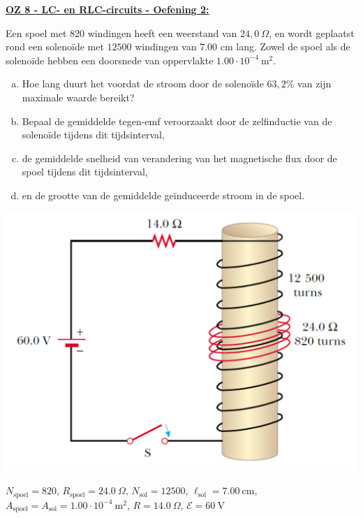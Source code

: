\textbf{\underline{OZ 8 - LC- en  RLC-circuits - Oefening 2:}}
\vspace{0.5cm}

Een spoel met $820$ windingen heeft een weerstand van $24,0 \ \Omega$, en wordt geplaatst rond een solenoïde met $12500$ windingen van $7.00$ cm lang. Zowel de spoel als de solenoïde hebben een doorsnede van oppervlakte $1.00\cdot10^{-4} \ \text{m}^2$.

\vspace{0.3cm}
\begin{minipage}{.66\textwidth}
    \begin{enumerate}[(a)]
        \item 
            Hoe lang duurt het voordat de stroom door de solenoïde $63,2\%$ van zijn maximale waarde bereikt?
        \item 
            Bepaal de gemiddelde tegen-emf veroorzaakt door de zelfinductie van de solenoïde tijdens dit tijdsinterval,
        \item 
            de gemiddelde snelheid van verandering van het magnetische flux door de spoel tijdens dit tijdsinterval,
        \item 
            en de grootte van de gemiddelde geïnduceerde stroom in de spoel.
    \end{enumerate}
\end{minipage}
\begin{minipage}{.3\textwidth}
    \includegraphics[scale = 0.3]{oz08/resources/Oz8Oef2.png}
\end{minipage}

\begin{description}[labelwidth=1.5cm, leftmargin=!]
    \item[Geg. :]   $N_{\text{spoel}} = 820$, $R_{\text{spoel}} = 24.0 \ \Omega$, $N_{\text{sol}} = 12500$, $\ell_{\text{sol}} = 7.00 \ \text{cm}$, $A_{\text{spoel}} = A_{\text{sol}} = 1.00\cdot10^{-4} \ \text{m}^2$, $R = 14.0 \ \Omega$, $\mathcal{E} = 60 \ \text{V}$
\end{description}

